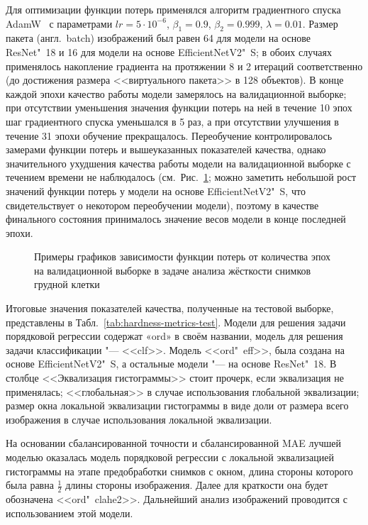 Для оптимизации функции потерь применялся алгоритм градиентного спуска AdamW~\cite{loshchilov2018decoupled} с параметрами $lr = 5 \cdot {10}^{-6}$, $\beta_1 = 0.9$, $\beta_2 = 0.999$, $\lambda = 0.01$. Размер пакета (англ.~batch) изображений был равен 64 для модели на основе ResNet"~18 и 16 для модели на основе EfficientNetV2"~S; в обоих случаях применялось накопление градиента на протяжении 8 и 2 итераций соответственно (до достижения размера <<виртуального пакета>> в 128 объектов). В конце каждой эпохи качество работы модели замерялось на валидационной выборке; при отсутствии уменьшения значения функции потерь на ней в течение 10 эпох шаг градиентного спуска уменьшался в 5 раз, а при отсутствии улучшения в течение 31 эпохи обучение прекращалось. Переобучение контролировалось замерами функции потерь и вышеуказанных показателей качества, однако значительного ухудшения качества работы модели на валидационной выборке с течением времени не наблюдалось (см.~Рис.~\ref{fig:val-losses}; можно заметить небольшой рост значений функции потерь у модели на основе EfficientNetV2"~S, что свидетельствует о некотором переобучении модели), поэтому в качестве финального состояния принималось значение весов модели в конце последней эпохи.

\begin{figure}[ht]
	\caption{Примеры графиков зависимости функции потерь от количества эпох на валидационной выборке в задаче анализа жёсткости снимков грудной клетки}
	\label{fig:val-losses}
\end{figure}

Итоговые значения показателей качества, полученные на тестовой выборке, представлены в Табл.~\ref{tab:hardness-metrics-test}. Модели для решения задачи порядковой регрессии содержат «ord» в своём названии, модель для решения задачи классификации "--- <<clf>>. Модель <<ord"~eff>>, была создана на основе EfficientNetV2"~S, а остальные модели "--- на основе ResNet"~18. В столбце <<Эквализация гистограммы>> стоит прочерк, если эквализация не применялась; <<глобальная>> в случае использования глобальной эквализации; размер окна локальной эквализации гистограммы в виде доли от размера всего изображения в случае использования локальной эквализации.

На основании сбалансированной точности и сбалансированной MAE лучшей моделью оказалась модель порядковой регрессии с локальной эквализацией гистограммы на этапе предобработки снимков с окном, длина стороны которого была равна $\frac{1}{2}$ длины стороны изображения. Далее для краткости она будет обозначена <<ord"~clahe2>>. Дальнейший анализ изображений проводится с использованием этой модели.

